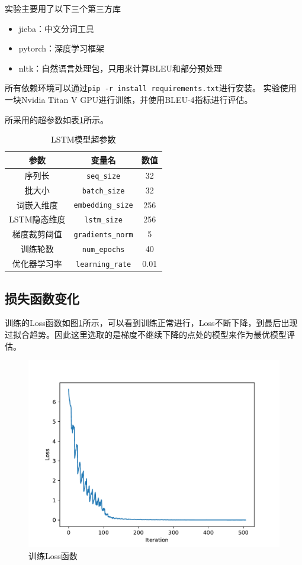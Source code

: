 \documentclass[logo,reportComp]{thesis}
\begin{document}
实验主要用了以下三个第三方库
\begin{itemize}
    \item jieba：中文分词工具
    \item pytorch：深度学习框架
    \item nltk：自然语言处理包，只用来计算BLEU和部分预处理
\end{itemize}
所有依赖环境可以通过\verb'pip -r install requirements.txt'进行安装。
实验使用一块Nvidia Titan V GPU进行训练，并使用BLEU-4指标进行评估。

所采用的超参数如表\ref{tab:lstm_hyperparam}所示。
\begin{table}[H]
\caption{LSTM模型超参数}
\label{tab:lstm_hyperparam}
\centering
\begin{tabular}{|c|c|c|}\hline
参数 & 变量名 & 数值\\\hline
序列长 & \verb'seq_size' & 32\\\hline
批大小 & \verb'batch_size' & 32\\\hline
词嵌入维度 & \verb'embedding_size' & 256\\\hline
LSTM隐态维度\cite{bib:pytorch_lstm} & \verb'lstm_size' & 256\\\hline
梯度裁剪阈值\cite{bib:gradient_clipping} & \verb'gradients_norm' & 5\\\hline
训练轮数 & \verb'num_epochs' & 40\\\hline
优化器学习率 & \verb'learning_rate' & 0.01\\\hline
\end{tabular}
\end{table}

\subsection{损失函数变化}
训练的Loss函数如图\ref{fig:train_loss}所示，可以看到训练正常进行，Loss不断下降，到最后出现过拟合趋势。因此这里选取的是梯度不继续下降的点处的模型来作为最优模型评估。
\begin{figure}[H]
\centering
\includegraphics[width=0.5\linewidth]{fig/train_loss.pdf}
\caption{训练Loss函数}
\label{fig:train_loss}
\end{figure}
\end{document}
